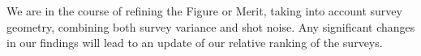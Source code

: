 
We are in the course of refining the Figure or Merit, taking into account survey geometry, combining both survey variance and shot noise.
Any significant changes in our findings will lead to an update of our relative
ranking of the surveys.






